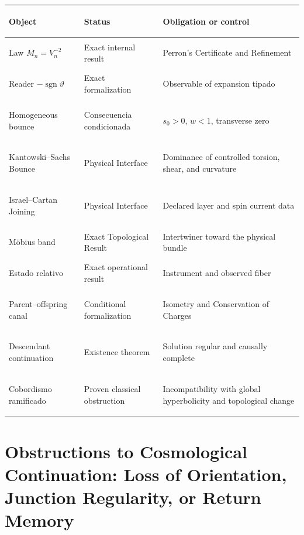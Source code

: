 \begin{center}
\small
\begin{tabularx}{\textwidth}{>{\bfseries\raggedright\arraybackslash}p{31mm}YY}
\toprule
Object & Status & Obligation or control\\
\midrule
Law \(M_n=V_n^{-2}\) & Exact internal result & Perron's Certificate and Refinement\\
Reader \(-\operatorname{sgn}\vartheta\) & Exact formalization & Observable of expansion tipado\\
Homogeneous bounce & Consecuencia condicionada & \(s_0>0\), \(w<1\), transverse zero\\
Kantowski--Sachs Bounce & Physical Interface & Dominance of controlled torsion, shear, and curvature\\
Israel--Cartan Joining & Physical Interface & Declared layer and spin current data\\
Möbius band & Exact Topological Result & Intertwiner toward the physical bundle\\
Estado relativo & Exact operational result & Instrument and observed fiber\\
Parent--offspring canal & Conditional formalization & Isometry and Conservation of Charges\\
Descendant continuation & Existence theorem & Solution regular and causally complete\\
Cobordismo ramificado & Proven classical obstruction & Incompatibility with global hyperbolicity and topological change\\
\bottomrule
\end{tabularx}
\end{center}

\section{Obstructions to Cosmological Continuation: Loss of Orientation, Junction Regularity, or Return Memory}


